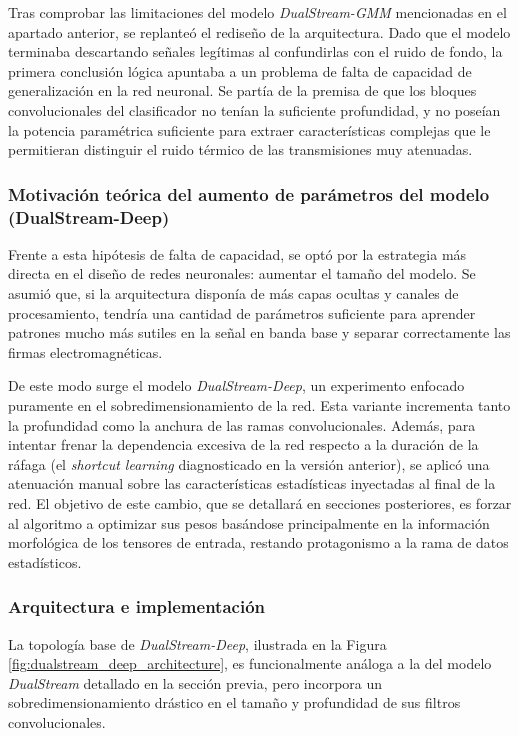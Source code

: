 Tras comprobar las limitaciones del modelo \textit{DualStream-GMM} mencionadas en el apartado anterior, se replanteó el rediseño de la arquitectura. Dado que el modelo terminaba descartando señales legítimas al confundirlas con el ruido de fondo, la primera conclusión lógica apuntaba a un problema de falta de capacidad de generalización en la red neuronal. Se partía de la premisa de que los bloques convolucionales del clasificador no tenían la suficiente profundidad, y no poseían la potencia paramétrica suficiente para extraer características complejas que le permitieran distinguir el ruido térmico de las transmisiones muy atenuadas.

\subsubsection{Motivación teórica del aumento de parámetros del modelo (DualStream-Deep)}
Frente a esta hipótesis de falta de capacidad, se optó por la estrategia más directa en el diseño de redes neuronales: aumentar el tamaño del modelo. Se asumió que, si la arquitectura disponía de más capas ocultas y canales de procesamiento, tendría una cantidad de parámetros suficiente para aprender patrones mucho más sutiles en la señal en banda base y separar correctamente las firmas electromagnéticas.

De este modo surge el modelo \textit{DualStream-Deep}, un experimento enfocado puramente en el sobredimensionamiento de la red. Esta variante incrementa tanto la profundidad como la anchura de las ramas convolucionales. Además, para intentar frenar la dependencia excesiva de la red respecto a la duración de la ráfaga (el \textit{shortcut learning} diagnosticado en la versión anterior), se aplicó una atenuación manual sobre las características estadísticas inyectadas al final de la red. El objetivo de este cambio, que se detallará en secciones posteriores, es forzar al algoritmo a optimizar sus pesos basándose principalmente en la información morfológica de los tensores de entrada, restando protagonismo a la rama de datos estadísticos.

\subsubsection{Arquitectura e implementación}
La topología base de \textit{DualStream-Deep}, ilustrada en la Figura \ref{fig:dualstream_deep_architecture}, es funcionalmente análoga a la del modelo \textit{DualStream} detallado en la sección previa, pero incorpora un sobredimensionamiento drástico en el tamaño y profundidad de sus filtros convolucionales.

